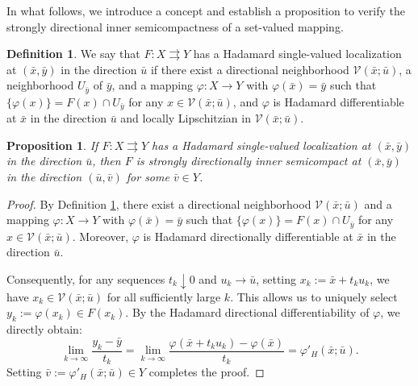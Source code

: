 \documentclass[12pt,twoside,reqno]{amsart}
\newtheorem{proposition}[theorem]{Proposition}
\theoremstyle{definition}
\newtheorem{definition}[theorem]{Definition}
\numberwithin{equation}{section}
\begin{document}
In what follows, we introduce a concept and establish a proposition to verify the strongly directional inner semicompactness of a set-valued mapping. 

\begin{definition}\label{defn:directionally_single_valued}
    We say that $F: X \rightrightarrows Y$ has a Hadamard single-valued localization at $(\bar{x}, \bar{y})$ in the direction $\bar{u}$ if there exist a directional neighborhood $\mathcal{V}(\bar{x}; \bar{u})$, a neighborhood $U_{\bar{y}}$ of $\bar{y}$, and a mapping $\varphi: X \to Y$ with $\varphi(\bar{x}) = \bar{y}$ such that $\{\varphi(x)\} = F(x) \cap U_{\bar{y}}$ for any $x \in \mathcal{V}(\bar{x}; \bar{u})$, and $\varphi$ is Hadamard differentiable at $\bar{x}$ in the direction $\bar{u}$ and locally Lipschitzian in $\mathcal{V}(\bar{x}; \bar{u})$. 
\end{definition}

\begin{proposition}\label{prop: single_valued_implies_semicompact}
    If $F: X \rightrightarrows Y$ has a Hadamard single-valued localization at $(\bar{x}, \bar{y})$ in the direction $\bar{u}$, then $F$ is strongly directionally inner semicompact at $(\bar x,\bar y)$ in the direction $(\bar u,\bar v)$ for some $\bar v\in Y$. 
\end{proposition}

\begin{proof}
    By Definition \ref{defn:directionally_single_valued}, there exist a directional neighborhood $\mathcal{V}(\bar{x}; \bar{u})$ and a mapping $\varphi: X \to Y$ with $\varphi(\bar{x}) = \bar{y}$ such that $\{\varphi(x)\} = F(x) \cap U_{\bar{y}}$ for any $x \in \mathcal{V}(\bar{x}; \bar{u})$. Moreover, $\varphi$ is Hadamard directionally differentiable at $\bar{x}$ in the direction $\bar{u}$. 
    
    Consequently, for any sequences $t_k \downarrow 0$ and $u_k \to \bar{u}$, setting $x_k := \bar{x} + t_k u_k$, we have $x_k \in \mathcal{V}(\bar{x}; \bar{u})$ for all sufficiently large $k$. This allows us to uniquely select $y_k := \varphi(x_k) \in F(x_k)$. By the Hadamard directional differentiability of $\varphi$, we directly obtain:
    \begin{equation*}
        \lim_{k \to \infty} \frac{y_k - \bar{y}}{t_k} = \lim_{k \to \infty} \frac{\varphi(\bar{x} + t_k u_k) - \varphi(\bar{x})}{t_k} = \varphi'_H(\bar{x}; \bar{u}).
    \end{equation*}
    Setting $\bar{v} := \varphi'_H(\bar{x}; \bar{u}) \in Y$ completes the proof.
\end{proof}
\end{document}
